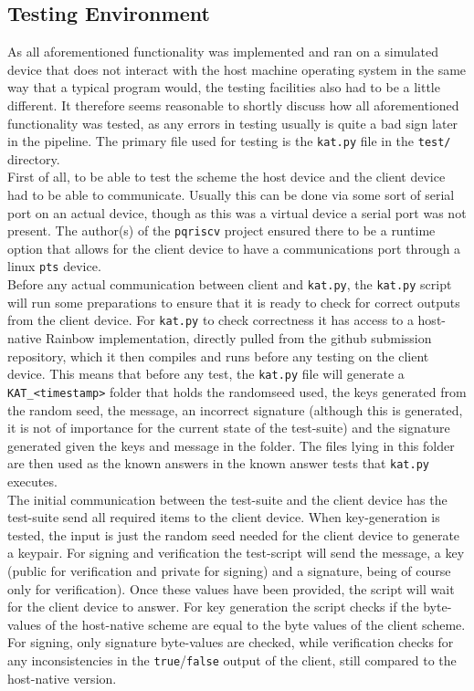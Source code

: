 \subsection{Testing Environment}
As all aforementioned functionality was implemented and ran on a simulated device that does not interact with the host machine operating system in the same way that a typical program would, the testing facilities also had to be a little different. It therefore seems reasonable to shortly discuss how all aforementioned functionality was tested, as any errors in testing usually is quite a bad sign later in the pipeline. The primary file used for testing is the \texttt{kat.py} file in the \texttt{test/} directory.\medskip\\
First of all, to be able to test the scheme the host device and the client device had to be able to communicate. Usually this can be done via some sort of serial port on an actual device, though as this was a virtual device a serial port was not present. The author(s) of the \texttt{pqriscv} project ensured there to be a runtime option that allows for the client device to have a communications port through a linux \texttt{pts} device.\medskip\\
Before any actual communication between client and \texttt{kat.py}, the \texttt{kat.py} script will run some preparations to ensure that it is ready to check for correct outputs from the client device. For \texttt{kat.py} to check correctness it has access to a host-native Rainbow implementation, directly pulled from the github submission repository, which it then compiles and runs before any testing on the client device. This means that before any test, the \texttt{kat.py} file will generate a \texttt{KAT\_<timestamp>} folder that holds the randomseed used, the keys generated from the random seed, the message, an incorrect signature (although this is generated, it is not of importance for the current state of the test-suite) and the signature generated given the keys and message in the folder. The files lying in this folder are then used as the known answers in the known answer tests that \texttt{kat.py} executes.\medskip\\
The initial communication between the test-suite and the client device has the test-suite send all required items to the client device. When key-generation is tested, the input is just the random seed needed for the client device to generate a keypair. For signing and verification the test-script will send the message, a key (public for verification and private for signing) and a signature, being of course only for verification). Once these values have been provided, the script will wait for the client device to answer. For key generation the script checks if the byte-values of the host-native scheme are equal to the byte values of the client scheme. For signing, only signature byte-values are checked, while verification checks for any inconsistencies in the \texttt{true}/\texttt{false} output of the client, still compared to the host-native version.

